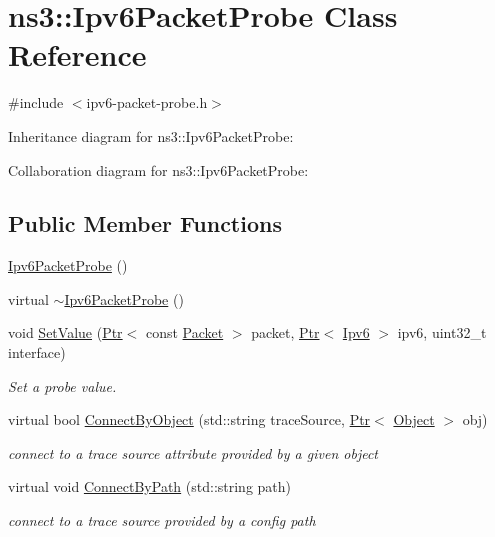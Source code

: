 \hypertarget{classns3_1_1Ipv6PacketProbe}{}\section{ns3\+:\+:Ipv6\+Packet\+Probe Class Reference}
\label{classns3_1_1Ipv6PacketProbe}


{\ttfamily \#include $<$ipv6-\/packet-\/probe.\+h$>$}



Inheritance diagram for ns3\+:\+:Ipv6\+Packet\+Probe\+:


Collaboration diagram for ns3\+:\+:Ipv6\+Packet\+Probe\+:
\subsection*{Public Member Functions}
\begin{DoxyCompactItemize}
\item 
\hyperlink{classns3_1_1Ipv6PacketProbe_a2643e4072ef93c05f6135f9f8ffabdab}{Ipv6\+Packet\+Probe} ()
\item 
virtual \hyperlink{classns3_1_1Ipv6PacketProbe_a090e60cfd4498a5464a8c37b6d64b350}{$\sim$\+Ipv6\+Packet\+Probe} ()
\item 
void \hyperlink{classns3_1_1Ipv6PacketProbe_abc47eed65e40da3e7a95c5fa64b0cda5}{Set\+Value} (\hyperlink{classns3_1_1Ptr}{Ptr}$<$ const \hyperlink{classns3_1_1Packet}{Packet} $>$ packet, \hyperlink{classns3_1_1Ptr}{Ptr}$<$ \hyperlink{classns3_1_1Ipv6}{Ipv6} $>$ ipv6, uint32\+\_\+t interface)
\begin{DoxyCompactList}\small\item\em Set a probe value. \end{DoxyCompactList}\item 
virtual bool \hyperlink{classns3_1_1Ipv6PacketProbe_ae678d5328186c457ff68dccb88b6d24f}{Connect\+By\+Object} (std\+::string trace\+Source, \hyperlink{classns3_1_1Ptr}{Ptr}$<$ \hyperlink{classns3_1_1Object}{Object} $>$ obj)
\begin{DoxyCompactList}\small\item\em connect to a trace source attribute provided by a given object \end{DoxyCompactList}\item 
virtual void \hyperlink{classns3_1_1Ipv6PacketProbe_aef98bcfb1fb84491f91748400b414e63}{Connect\+By\+Path} (std\+::string path)
\begin{DoxyCompactList}\small\item\em connect to a trace source provided by a config path \end{DoxyCompactList}\end{DoxyCompactItemize}

